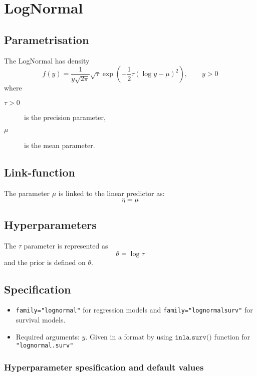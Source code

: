 \documentclass[a4paper,11pt]{article}
\begin{document}
\section*{LogNormal}

\subsection*{Parametrisation}

The LogNormal has density
\begin{displaymath}
    f(y) = \frac{1}{y\sqrt{2\pi}} \sqrt{\tau} \exp\left(
      -\frac{1}{2} \tau (\log y - \mu)^{2}
    \right), \qquad y > 0
\end{displaymath}
where
\begin{description}
\item[$\tau > 0$] is the precision parameter,
\item[$\mu$] is the mean parameter.
\end{description}

\subsection*{Link-function}

The parameter $\mu$ is linked to the linear predictor as:
\[
\eta = \mu
\]
\subsection*{Hyperparameters}

The $\tau$ parameter is represented as
\[
\theta = \log\tau
\]
and the prior is defined on $\theta$.

\subsection*{Specification}

\begin{itemize}
\item \texttt{family="lognormal"} for regression models and
    \texttt{family="lognormalsurv"} for survival models.
\item Required arguments: $y$. Given in a format by using
    $\texttt{inla.surv()}$ function for \texttt{"lognormal.surv"}
\end{itemize}

\subsubsection*{Hyperparameter spesification and default values}
\end{document}
